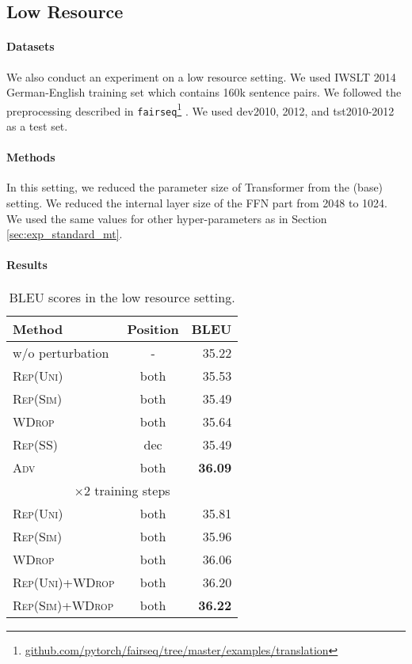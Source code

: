 \documentclass[11pt]{article}
\newcommand{\uniform}{\textsc{Rep(Uni)}}
\newcommand{\parass}{\textsc{Rep(SS)}}
\newcommand{\similarity}{\textsc{Rep(Sim)}}
\newcommand{\worddrop}{\textsc{WDrop}}
\newcommand{\adv}{\textsc{Adv}}
\begin{document}
\subsection{Low Resource}


\paragraph{Datasets}
We also conduct an experiment on a low resource setting.
We used IWSLT 2014 German-English training set which contains 160k sentence pairs.
We followed the preprocessing described in \texttt{fairseq}\footnote{\href{https://github.com/pytorch/fairseq/tree/master/examples/translation}{github.com/pytorch/fairseq/tree/master/examples/translation}} \cite{ott-etal-2019-fairseq}.
We used dev2010, 2012, and tst2010-2012 as a test set.

\paragraph{Methods}
In this setting, we reduced the parameter size of Transformer from the (base) setting.
We reduced the internal layer size of the FFN part from 2048 to 1024.
We used the same values for other hyper-parameters as in Section \ref{sec:exp_standard_mt}.



\paragraph{Results}
\label{sec:ex_mt_low_resource}
\begin{table}[!t]
  \centering
  \footnotesize
  \begin{tabular}{ l | c | r } \hline
  Method & Position & BLEU \\ \hline 
  w/o perturbation & - & 35.22 \\ \hline
  \uniform{} & both & 35.53\\
  \similarity{} & both & 35.49 \\
  \worddrop{} & both & 35.64 \\
  \parass{} & dec & 35.49 \\
  \adv{} & both & \textbf{36.09} \\ \hline
  \multicolumn{3}{c}{$\times$2 training steps} \\ \hline
  \uniform{} & both & 35.81 \\
  \similarity{} & both & 35.96 \\
  \worddrop{} & both & 36.06 \\
  \uniform{}+\worddrop{} & both & 36.20 \\
  \similarity{}+\worddrop{} & both & \textbf{36.22}\\ \hline
  \end{tabular}
  \caption{BLEU scores in the low resource setting.\label{tab:exp_mt_on_low_resource}}
\end{table}
\end{document}
